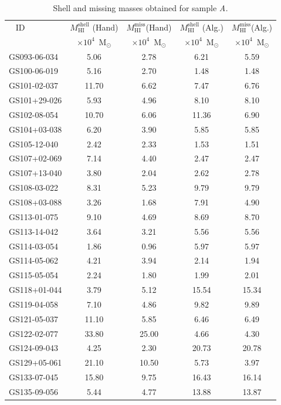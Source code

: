 \documentclass{aa}
\begin{document}
\begin{table}
\caption{Shell and missing masses obtained for sample \it {A}. } 
\label{massesA}
\centering  
\begin{tabular}{l c c c c }
\hline \hline
   \,\,\, ID & $M_{\mathrm{HI}}^{\mathrm{shell}}$ (Hand)  &  $M_{\mathrm{HI}}^{\mathrm{miss}} $(Hand)& $M_{\mathrm{HI}}^{\mathrm{shell}}$ (Alg.)  &  $M_{\mathrm{HI}}^{\mathrm{miss}} $(Alg.)\\
  & $\times 10^4$\, M$_\odot$ &  $\times 10^4$\, M$_\odot$ & $\times 10^4$\, M$_\odot$ & $\times 10^4$\, M$_\odot$ \\
\hline
GS093-06-034	&	5.06	&	2.78	&	6.21	&	5.59	\\
GS100-06-019	&	5.16	&	2.70	&	1.48	&	1.48	\\
GS101-02-037	&	11.70	&	6.62	&	7.47	&	6.76	\\
GS101+29-026	&	5.93	&	4.96	&	8.10	&	8.10	\\
GS102-08-054	&	10.70	&	6.06	&	11.36	&	6.90	\\
GS104+03-038	&	6.20	&	3.90	&	5.85	&	5.85	\\
GS105-12-040	&	2.42	&	2.33	&	1.53	&	1.51	\\
GS107+02-069	&	7.14	&	4.40	&	2.47	&	2.47	\\
GS107+13-040	&	3.80	&	2.04	&	2.62	&	2.78	\\
GS108-03-022	&	8.31	&	5.23	&	9.79	&	9.79	\\
GS108+03-088	&	3.26	&	1.68	&	7.91	&	4.90	\\
GS113-01-075	&	9.10	&	4.69	&	8.69	&	8.70	\\
GS113-14-042	&	3.64	&	3.21	&	5.56	&	5.56	\\
GS114-03-054	&	1.86	&	0.96	&	5.97	&	5.97	\\
GS114-05-062	&	4.21	&	3.94	&	2.14	&	1.94	\\
GS115-05-054	&	2.24	&	1.80	&	1.99	&	2.01	\\
GS118+01-044	&	3.79	&	5.12	&	15.54	&	15.34	\\
GS119-04-058	&	7.10	&	4.86	&	9.82	&	9.89	\\
GS121-05-037	&	11.10	&	5.85	&	6.46	&	6.49	\\
GS122-02-077	&	33.80	&	25.00	&	4.66	&	4.30	\\
GS124-09-043	&	4.25	&	2.30	&	20.73	&	20.78	\\
GS129+05-061	&	21.10	&	10.50	&	5.73	&	3.97	\\
GS133-07-045	&	15.80	&	9.75	&	16.43	&	16.14	\\
GS135-09-056	&	5.44	&	4.77	&	13.88	&	13.87	\\

\end{tabular}
\end{table}
\end{document}
